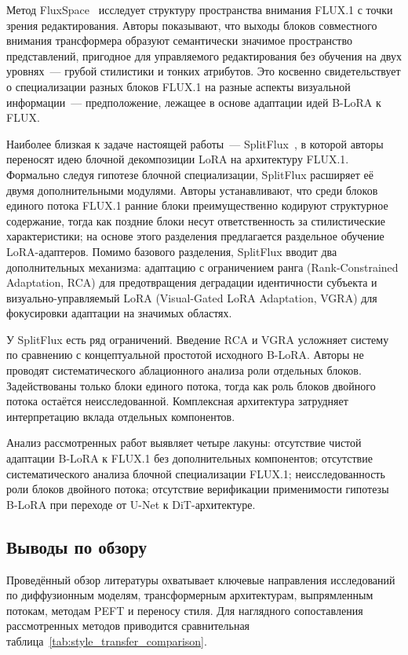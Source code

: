 Метод FluxSpace~\cite{dalva2024fluxspace} исследует структуру пространства внимания FLUX.1 с точки зрения редактирования. Авторы показывают, что выходы блоков совместного внимания трансформера образуют семантически значимое пространство представлений, пригодное для управляемого редактирования без обучения на двух уровнях~--- грубой стилистики и тонких атрибутов. Это косвенно свидетельствует о специализации разных блоков FLUX.1 на разные аспекты визуальной информации~--- предположение, лежащее в основе адаптации идей B-LoRA к FLUX.

Наиболее близкая к задаче настоящей работы~--- SplitFlux~\cite{yang2025splitflux}, в которой авторы переносят идею блочной декомпозиции LoRA на архитектуру FLUX.1. Формально следуя гипотезе блочной специализации, SplitFlux расширяет её двумя дополнительными модулями. Авторы устанавливают, что среди блоков единого потока FLUX.1 ранние блоки преимущественно кодируют структурное содержание, тогда как поздние блоки несут ответственность за стилистические характеристики; на основе этого разделения предлагается раздельное обучение LoRA-адаптеров. Помимо базового разделения, SplitFlux вводит два дополнительных механизма: адаптацию с ограничением ранга (Rank-Constrained Adaptation, RCA) для предотвращения деградации идентичности субъекта и визуально-управляемый LoRA (Visual-Gated LoRA Adaptation, VGRA) для фокусировки адаптации на значимых областях.

У SplitFlux есть ряд ограничений. Введение RCA и VGRA усложняет систему по сравнению с концептуальной простотой исходного B-LoRA. Авторы не проводят систематического аблационного анализа роли отдельных блоков. Задействованы только блоки единого потока, тогда как роль блоков двойного потока остаётся неисследованной. Комплексная архитектура затрудняет интерпретацию вклада отдельных компонентов.

Анализ рассмотренных работ выявляет четыре лакуны: отсутствие чистой адаптации B-LoRA к FLUX.1 без дополнительных компонентов; отсутствие систематического анализа блочной специализации FLUX.1; неисследованность роли блоков двойного потока; отсутствие верификации применимости гипотезы B-LoRA при переходе от U-Net к DiT-архитектуре.


\subsection{Выводы по обзору}

Проведённый обзор литературы охватывает ключевые направления исследований по диффузионным моделям, трансформерным архитектурам, выпрямленным потокам, методам PEFT и переносу стиля. Для наглядного сопоставления рассмотренных методов приводится сравнительная таблица~\ref{tab:style_transfer_comparison}.

